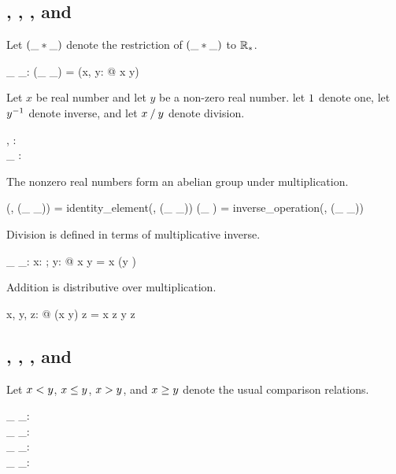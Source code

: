 \documentclass{amsart}
\begin{document}
\subsection{, , , and }

Let $(\_ \mathbin{*} \_)$ denote the restriction of $(\_ \mathbin{*} \_)$ to $\mathbb{R}_{*}$.

\begin{axdef}
	\_ \mulRnz \_: \Rnz \cross \Rnz \fun \Rnz
	\where
	(\_ \mulRnz \_) = (\lambda x, y: \Rnz @ x \mulR y)
\end{axdef}

Let $x$ be real number and let $y$ be a non-zero real number.
let $1$ denote one,
let $y ^{-1}$ denote inverse,
and let $x \mathbin{/} y$ denote division.

\begin{axdef}
	\oneR, \twoR: \Rnz \\
	\_ \invRnz: \Rnz \fun \Rnz
\end{axdef}

The nonzero real numbers form an abelian group under multiplication.

\begin{zed}
(\Rnz, (\_ \mulRnz \_)) \in \abgroup \Rnz
\also
\oneR = identity\_element(\Rnz, (\_ \mulRnz \_))
\also
(\_ \invRnz) = inverse\_operation(\Rnz, (\_ \mulRnz \_))
\end{zed}

Division is defined in terms of multiplicative inverse.

\begin{axdef}
	\_ \divR \_: \R \cross \Rnz \fun \R
	\where
	\forall x: \R; y: \Rnz @ x \divR y = x \mulR (y \invRnz)
\end{axdef}

Addition is distributive over multiplication.

\begin{zed}
	\forall x, y, z: \R @ (x \addR y) \mulR z = x \mulR z \addR y \mulR z
\end{zed}

\subsection{, , , and }

Let $x \mathrel{<} y$, $x \mathrel{\leq} y$, $x \mathrel{>} y$, and $x \mathrel{\geq} y$ denote the usual comparison relations.

\begin{axdef}
	\_ \ltR \_: \R \rel \R \\
	\_ \leR \_: \R \rel \R \\
	\_ \gtR \_: \R \rel \R \\
	\_ \geR \_: \R \rel \R
\end{axdef}
\end{document}
